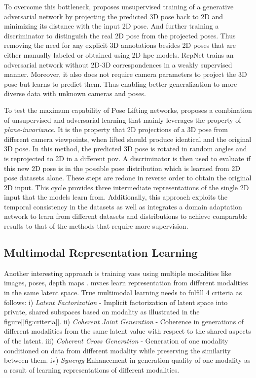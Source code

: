 To overcome this bottleneck, \cite{unsupervisedAdversarial} proposes unsupervised training of a generative adversarial network by projecting the predicted 3D pose back to 2D and minimizing its distance with the input 2D pose. And further training a discriminator to distinguish the real 2D pose from the projected poses. Thus removing the need for any explicit 3D annotations besides 2D poses that are either manually labeled or obtained using 2D \ac{hpe} models. RepNet \cite{repnet} trains an adversarial network without 2D-3D correspondences in a weakly supervised manner. Moreover, it also does not require camera parameters to project the 3D pose but learns to predict them. Thus enabling better generalization to more diverse data with unknown cameras and poses.

To test the maximum capability of Pose Lifting networks, \cite{amazon1} proposes a combination of unsupervised and adversarial learning that mainly leverages the property of \textit{plane-invariance}. It is the property that 2D projections of a 3D pose from different camera viewpoints, when lifted should produce identical and the original 3D pose. In this method, the predicted 3D pose is rotated in random angles and is reprojected to 2D in a different \ac{pov}. A discriminator is then used to evaluate if this new 2D pose is in the possible pose distribution which is learned from 2D pose datasets alone. These steps are redone in reverse order to obtain the original 2D input. This cycle provides three intermediate representations of the single 2D input that the models learn from. Additionally, this approach exploits the temporal consistency in the datasets as well as integrates a domain adaptation network to learn from different datasets and distributions to achieve comparable results to that of the methods that require more supervision.


\subsection{Multimodal Representation Learning}
\label{section:multimodal_representation_learning}
Another interesting approach is training \ac{vae}s using multiple modalities like images, poses, depth maps \cite{CrossingNets, crossmodal, MMVAE,HandDisentangled}. \ac{mvae}s learn representation from different modalities in the same latent space. True multimodal learning needs to fulfill 4 criteria as follows: i) \textit{Latent Factorization} - Implicit factorization of latent space into private, shared subspaces based on modality as illustrated in the figure[\ref{fig:criteria}]. ii) \textit{Coherent Joint Generation} - Coherence in generations of different modalities from the same latent value with respect to the shared aspects of the latent. iii) \textit{Coherent Cross Generation} - Generation of one modality conditioned on data from different modality while preserving the similarity between them. iv) \textit{Synergy} Enhancement in generation quality of one modality as a result of learning representations of different modalities.

